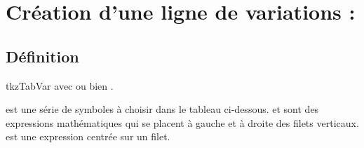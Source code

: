 \section{Création d'une ligne de variations : }
\subsection{Définition}

\begin{NewMacroBox}{tkzTabVar}{}
  avec  ou bien     .

\noindent{} est une série de symboles à choisir dans le tableau ci-dessous.  et  sont des expressions mathématiques qui se placent à gauche et à droite des filets verticaux.  est une expression centrée sur un filet.


\end{NewMacroBox}
